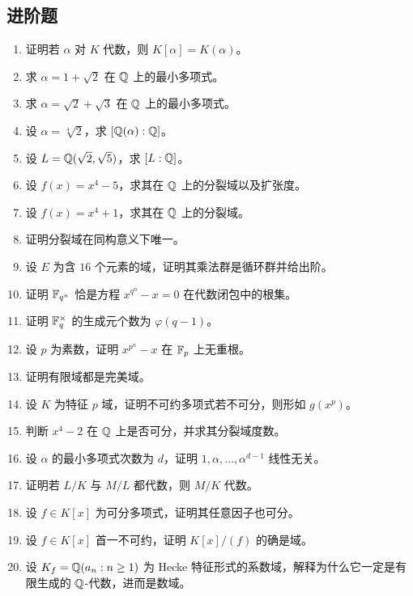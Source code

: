 \subsection*{进阶题}
\begin{enumerate}[resume, label=\textbf{\arabic*.}, leftmargin=*, itemsep=0.5em]
\item \medium 证明若 $\alpha$ 对 $K$ 代数，则 $K[\alpha]=K(\alpha)$。
\item \medium 求 $\alpha=1+\sqrt2$ 在 $\mathbb{Q}$ 上的最小多项式。
\item \medium 求 $\alpha=\sqrt2+\sqrt3$ 在 $\mathbb{Q}$ 上的最小多项式。
\item \medium 设 $\alpha=\sqrt[4]{2}$，求 $[\mathbb{Q}(\alpha):\mathbb{Q}]$。
\item \medium 设 $L=\mathbb{Q}(\sqrt2,\sqrt5)$，求 $[L:\mathbb{Q}]$。
\item \medium 设 $f(x)=x^4-5$，求其在 $\mathbb{Q}$ 上的分裂域以及扩张度。
\item \medium 设 $f(x)=x^4+1$，求其在 $\mathbb{Q}$ 上的分裂域。
\item \medium 证明分裂域在同构意义下唯一。
\item \medium 设 $E$ 为含 $16$ 个元素的域，证明其乘法群是循环群并给出阶。
\item \medium 证明 $\mathbb{F}_{q^n}$ 恰是方程 $x^{q^n}-x=0$ 在代数闭包中的根集。
\item \medium 证明 $\mathbb{F}_q^\times$ 的生成元个数为 $\varphi(q-1)$。
\item \medium 设 $p$ 为素数，证明 $x^{p^n}-x$ 在 $\mathbb{F}_p$ 上无重根。
\item \medium 证明有限域都是完美域。
\item \medium 设 $K$ 为特征 $p$ 域，证明不可约多项式若不可分，则形如 $g(x^p)$。
\item \medium 判断 $x^4-2$ 在 $\mathbb{Q}$ 上是否可分，并求其分裂域度数。
\item \medium 设 $\alpha$ 的最小多项式次数为 $d$，证明 $1,\alpha,\dots,\alpha^{d-1}$ 线性无关。
\item \medium 证明若 $L/K$ 与 $M/L$ 都代数，则 $M/K$ 代数。
\item \medium 设 $f\in K[x]$ 为可分多项式，证明其任意因子也可分。
\item \medium 设 $f\in K[x]$ 首一不可约，证明 $K[x]/(f)$ 的确是域。
\item \medium 设 $K_f=\mathbb{Q}(a_n:n\ge1)$ 为 Hecke 特征形式的系数域，解释为什么它一定是有限生成的 $\mathbb{Q}$-代数，进而是数域。
\end{enumerate}

